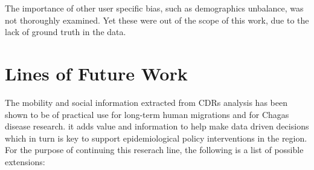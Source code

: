 The importance of other user specific bias, such as demographics unbalance, was not thoroughly examined.
Yet these were out of the scope of this work, due to the lack of ground truth in the data.





\section{ Lines of Future Work }


The mobility and social information extracted from CDRs analysis has been shown to be of practical use for long-term human migrations and for Chagas disease research.
it adds value and information to help make data driven decisions which in turn is key to support epidemiological policy interventions in the region.
For the purpose of continuing this reserach line, the following is a list of possible extensions:



